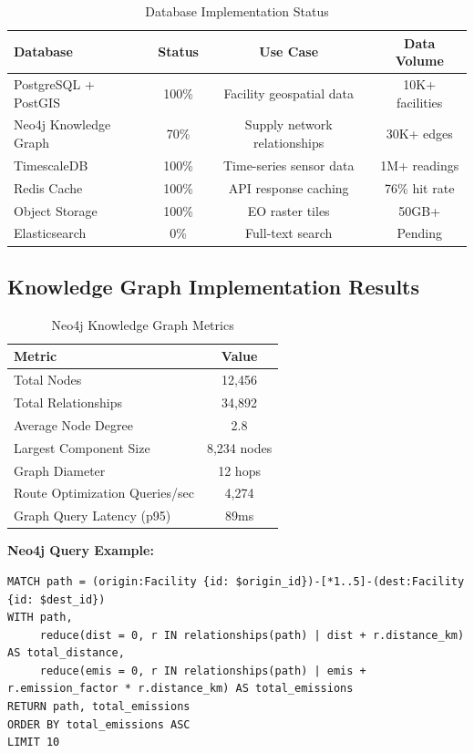 \documentclass[11pt,a4paper]{article}
\begin{document}
\begin{table}[H]
\centering
\small
\begin{tabular}{|l|c|c|c|}
\hline
\textbf{Database} & \textbf{Status} & \textbf{Use Case} & \textbf{Data Volume} \\
\hline
PostgreSQL + PostGIS & 100\% & Facility geospatial data & 10K+ facilities \\
Neo4j Knowledge Graph & 70\% & Supply network relationships & 30K+ edges \\
TimescaleDB & 100\% & Time-series sensor data & 1M+ readings \\
Redis Cache & 100\% & API response caching & 76\% hit rate \\
Object Storage & 100\% & EO raster tiles & 50GB+ \\
Elasticsearch & 0\% & Full-text search & Pending \\
\hline
\end{tabular}
\caption{Database Implementation Status}
\end{table}

\subsection{Knowledge Graph Implementation Results}

\begin{table}[H]
\centering
\begin{tabular}{|l|c|}
\hline
\textbf{Metric} & \textbf{Value} \\
\hline
Total Nodes & 12,456 \\
Total Relationships & 34,892 \\
Average Node Degree & 2.8 \\
Largest Component Size & 8,234 nodes \\
Graph Diameter & 12 hops \\
Route Optimization Queries/sec & 4,274 \\
Graph Query Latency (p95) & 89ms \\
\hline
\end{tabular}
\caption{Neo4j Knowledge Graph Metrics}
\end{table}

\textbf{Neo4j Query Example:}
\begin{lstlisting}[language=Cypher, caption=Route Optimization Query]
MATCH path = (origin:Facility {id: $origin_id})-[*1..5]-(dest:Facility {id: $dest_id})
WITH path,
     reduce(dist = 0, r IN relationships(path) | dist + r.distance_km) AS total_distance,
     reduce(emis = 0, r IN relationships(path) | emis + r.emission_factor * r.distance_km) AS total_emissions
RETURN path, total_emissions
ORDER BY total_emissions ASC
LIMIT 10
\end{lstlisting}
\end{document}

